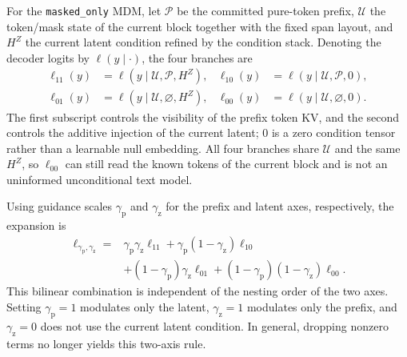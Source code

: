 For the \texttt{masked\_only} MDM, let $\mathcal P$ be the committed pure-token prefix, $\mathcal U$ the token/mask state of the current block together with the fixed span layout, and $H^Z$ the current latent condition refined by the condition stack. Denoting the decoder logits by $\ell(y\mid\cdot)$, the four branches are
\begin{equation}
\begin{aligned}
    \ell_{11}(y)&=\ell(y\mid\mathcal U,\mathcal P,H^Z),&
    \ell_{10}(y)&=\ell(y\mid\mathcal U,\mathcal P,0),\\
    \ell_{01}(y)&=\ell(y\mid\mathcal U,\varnothing,H^Z),&
    \ell_{00}(y)&=\ell(y\mid\mathcal U,\varnothing,0).
\end{aligned}
\label{eq:app-prefix-cfg-branches}
\end{equation}
The first subscript controls the visibility of the prefix token KV, and the second controls the additive injection of the current latent; $0$ is a zero condition tensor rather than a learnable null embedding. All four branches share $\mathcal U$ and the same $H^Z$, so $\ell_{00}$ can still read the known tokens of the current block and is not an uninformed unconditional text model.

Using guidance scales $\gamma_{\mathrm p}$ and $\gamma_{\mathrm z}$ for the prefix and latent axes, respectively, the expansion is
\begin{equation}
\begin{aligned}
    \ell_{\gamma_{\mathrm p},\gamma_{\mathrm z}}
    ={}&\gamma_{\mathrm p}\gamma_{\mathrm z}\ell_{11}
      +\gamma_{\mathrm p}(1-\gamma_{\mathrm z})\ell_{10}\\
      &+(1-\gamma_{\mathrm p})\gamma_{\mathrm z}\ell_{01}
      +(1-\gamma_{\mathrm p})(1-\gamma_{\mathrm z})\ell_{00}.
\end{aligned}
\label{eq:app-prefix-cfg-expanded}
\end{equation}
This bilinear combination is independent of the nesting order of the two axes. Setting $\gamma_{\mathrm p}=1$ modulates only the latent, $\gamma_{\mathrm z}=1$ modulates only the prefix, and $\gamma_{\mathrm z}=0$ does not use the current latent condition. In general, dropping nonzero terms no longer yields this two-axis rule.

